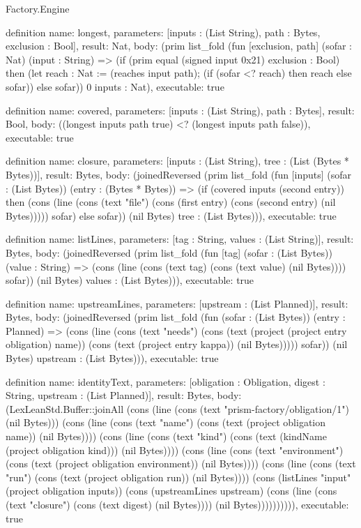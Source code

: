 \begin{lexlean}{Factory.Engine}
\begin{semanticmodule}
definition{
  name: longest,
  parameters: [inputs : (List String), path : Bytes, exclusion : Bool],
  result: Nat,
  body: (prim list_fold (fun [exclusion, path] (sofar : Nat) (input : String) => (if (prim equal (signed input 0x21) exclusion : Bool) then (let reach : Nat := (reaches input path); (if (sofar <? reach) then reach else sofar)) else sofar)) 0 inputs : Nat),
  executable: true
}

definition{
  name: covered,
  parameters: [inputs : (List String), path : Bytes],
  result: Bool,
  body: ((longest inputs path true) <? (longest inputs path false)),
  executable: true
}

definition{
  name: closure,
  parameters: [inputs : (List String), tree : (List (Bytes * Bytes))],
  result: Bytes,
  body: (joinedReversed (prim list_fold (fun [inputs] (sofar : (List Bytes)) (entry : (Bytes * Bytes)) => (if (covered inputs (second entry)) then (cons (line (cons (text "file") (cons (first entry) (cons (second entry) (nil Bytes))))) sofar) else sofar)) (nil Bytes) tree : (List Bytes))),
  executable: true
}

definition{
  name: listLines,
  parameters: [tag : String, values : (List String)],
  result: Bytes,
  body: (joinedReversed (prim list_fold (fun [tag] (sofar : (List Bytes)) (value : String) => (cons (line (cons (text tag) (cons (text value) (nil Bytes)))) sofar)) (nil Bytes) values : (List Bytes))),
  executable: true
}

definition{
  name: upstreamLines,
  parameters: [upstream : (List Planned)],
  result: Bytes,
  body: (joinedReversed (prim list_fold (fun (sofar : (List Bytes)) (entry : Planned) => (cons (line (cons (text "needs") (cons (text (project (project entry obligation) name)) (cons (text (project entry kappa)) (nil Bytes))))) sofar)) (nil Bytes) upstream : (List Bytes))),
  executable: true
}

definition{
  name: identityText,
  parameters: [obligation : Obligation, digest : String, upstream : (List Planned)],
  result: Bytes,
  body: (LexLeanStd.Buffer::joinAll (cons (line (cons (text "prism-factory/obligation/1") (nil Bytes))) (cons (line (cons (text "name") (cons (text (project obligation name)) (nil Bytes)))) (cons (line (cons (text "kind") (cons (text (kindName (project obligation kind))) (nil Bytes)))) (cons (line (cons (text "environment") (cons (text (project obligation environment)) (nil Bytes)))) (cons (line (cons (text "run") (cons (text (project obligation run)) (nil Bytes)))) (cons (listLines "input" (project obligation inputs)) (cons (upstreamLines upstream) (cons (line (cons (text "closure") (cons (text digest) (nil Bytes)))) (nil Bytes)))))))))),
  executable: true
}


\end{semanticmodule}
\end{lexlean}
